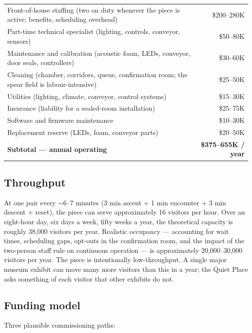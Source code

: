 \documentclass[10pt, letterpaper]{article}
\begin{document}
\begin{metricbox}
\begin{tabularx}{\textwidth}{@{} X r @{}}
Front-of-house staffing (two on duty whenever the piece is active; benefits, scheduling overhead) & \$200--280K \\
Part-time technical specialist (lighting, controls, conveyor, sensors) & \$50--80K \\
Maintenance and calibration (acoustic foam, LEDs, conveyor, door seals, controllers) & \$30--60K \\
Cleaning (chamber, corridors, queue, confirmation room; the spear field is labour-intensive) & \$25--50K \\
Utilities (lighting, climate, conveyor, control systems) & \$15--30K \\
Insurance (liability for a sealed-room installation) & \$25--75K \\
Software and firmware maintenance & \$10--30K \\
Replacement reserve (LEDs, foam, conveyor parts) & \$20--50K \\
\midrule
\textbf{Subtotal --- annual operating} & \textbf{\$375--655K / year} \\
\end{tabularx}
\end{metricbox}

\subsection{Throughput}

At one pair every $\sim$6--7 minutes (3 min ascent + 1 min encounter + 3 min descent + reset), the piece can serve approximately 16 visitors per hour. Over an eight-hour day, six days a week, fifty weeks a year, the theoretical capacity is roughly 38{,}000 visitors per year. Realistic occupancy --- accounting for wait times, scheduling gaps, opt-outs in the confirmation room, and the impact of the two-person staff rule on continuous operation --- is approximately 20{,}000--30{,}000 visitors per year. The piece is intentionally low-throughput. A single major museum exhibit can move many more visitors than this in a year; the Quiet Place asks something of each visitor that other exhibits do not.

\subsection{Funding model}

Three plausible commissioning paths:
\end{document}
